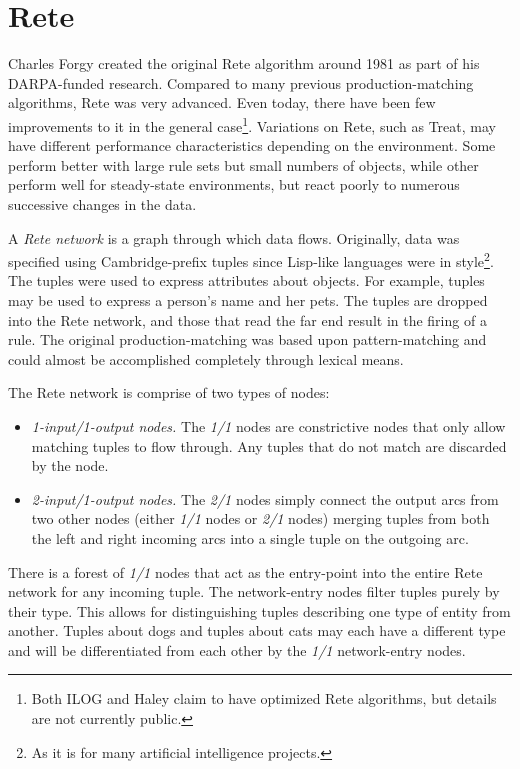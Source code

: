 \section{Rete}
\label{algo.rete}

Charles Forgy created the original Rete algorithm around 1981 as part
of his DARPA-funded research.  Compared to many previous
production-matching algorithms, Rete was very advanced.  Even today,
there have been few improvements to it in the general
case\footnote{Both ILOG and Haley claim to have optimized Rete
algorithms, but details are not currently public.}.  Variations on 
Rete, such as Treat, may have different performance characteristics
depending on the environment.  Some perform better with large rule 
sets but small numbers of objects, while other perform well for 
steady-state environments, but react poorly to numerous successive 
changes in the data.

A \emph{Rete network} is a graph through which data flows.
Originally, data was specified using Cambridge-prefix tuples since
Lisp-like languages were in style\footnote{As it is for many artificial
intelligence projects.}.  The tuples were used to express attributes
about objects.  For example, tuples may be used to express a person's
name and her pets.  The tuples are dropped into the Rete network,
and those that read the far end result in the firing of a rule.
The original production-matching was based upon pattern-matching and
could almost be accomplished completely through lexical means.

The Rete network is comprise of two types of nodes:

\begin{itemize}
	\item \emph{1-input/1-output nodes.}  The \emph{1/1} nodes are
		constrictive nodes that only allow matching tuples to
		flow through.  Any tuples that do not match are discarded
		by the node.
	\item \emph{2-input/1-output nodes.}
		The \emph{2/1} nodes simply connect the output arcs from two
		other nodes (either \emph{1/1} nodes or \emph{2/1} nodes) merging
		tuples from both the left and right incoming arcs
		into a single tuple on the outgoing arc.
\end{itemize}

There is a forest of \emph{1/1} nodes that act as the entry-point
into the entire Rete network for any incoming tuple.  The
network-entry  nodes filter tuples purely by their type.  
This allows for distinguishing tuples describing one type of 
entity from another.  Tuples about dogs and tuples about cats may 
each have a different type and will be differentiated from each 
other by the \emph{1/1} network-entry nodes.


